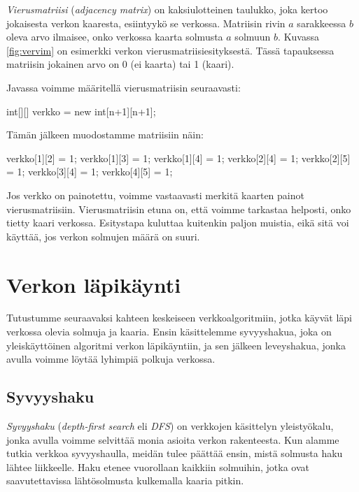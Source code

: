 \emph{Vierusmatriisi} (\emph{adjacency matrix}) on kaksiulotteinen taulukko,
joka kertoo jokaisesta verkon kaaresta,
esiintyykö se verkossa.
Matriisin rivin $a$ sarakkeessa $b$ oleva arvo
ilmaisee, onko verkossa kaarta solmusta $a$ solmuun $b$.
Kuvassa \ref{fig:vervim} on esimerkki
verkon vierusmatriisiesityksestä.
Tässä tapauksessa matriisin jokainen arvo on
0 (ei kaarta) tai 1 (kaari).

Javassa voimme määritellä vierusmatriisin seuraavasti:

\begin{code}
int[][] verkko = new int[n+1][n+1];
\end{code}

Tämän jälkeen muodostamme matriisiin näin:

\begin{code}
verkko[1][2] = 1;
verkko[1][3] = 1;
verkko[1][4] = 1;
verkko[2][4] = 1;
verkko[2][5] = 1;
verkko[3][4] = 1;
verkko[4][5] = 1;
\end{code}

Jos verkko on painotettu, voimme vastaavasti merkitä
kaarten painot vierusmatriisiin.
Vierusmatriisin etuna on, että voimme tarkastaa helposti,
onko tietty kaari verkossa.
Esitystapa kuluttaa kuitenkin paljon muistia,
eikä sitä voi käyttää, jos verkon solmujen määrä on suuri.

\section{Verkon läpikäynti}

Tutustumme seuraavaksi kahteen keskeiseen verkkoalgoritmiin,
jotka käyvät läpi verkossa olevia solmuja ja kaaria.
Ensin käsittelemme syvyyshakua, joka on yleiskäyttöinen algoritmi
verkon läpikäyntiin, ja sen jälkeen leveyshakua,
jonka avulla voimme löytää lyhimpiä polkuja verkossa.

\subsection{Syvyyshaku}


\emph{Syvyyshaku} (\emph{depth-first search} eli \emph{DFS})
on verkkojen käsittelyn yleistyökalu,
jonka avulla voimme selvittää monia asioita verkon rakenteesta.
Kun alamme tutkia verkkoa syvyyshaulla,
meidän tulee päättää ensin, mistä solmusta haku lähtee liikkeelle.
Haku etenee vuorollaan kaikkiin solmuihin, jotka ovat saavutettavissa
lähtösolmusta kulkemalla kaaria pitkin.

